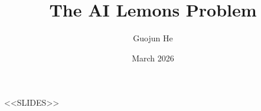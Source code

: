 \documentclass[10pt]{mycool}
\title{The AI Lemons Problem}
\author{Guojun He}
\institute{University of Hong Kong}
\date{March 2026}
\begin{document}
<<SLIDES>>
\end{document}
